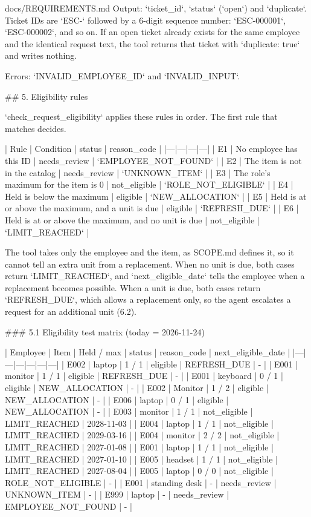 \documentclass[11pt,letterpaper]{article}
\renewcommand{\_}{\textunderscore\allowbreak}
\begin{document}
\begin{appendixpromptbox}{docs/REQUIREMENTS.md}
Output: `ticket_id`, `status` (`open`) and `duplicate`. Ticket IDs are `ESC-` followed by a
6-digit sequence number: `ESC-000001`, `ESC-000002`, and so on. If an open ticket already exists
for the same employee and the identical request text, the tool returns that ticket with
`duplicate: true` and writes nothing.

Errors: `INVALID_EMPLOYEE_ID` and `INVALID_INPUT`.

## 5. Eligibility rules

`check_request_eligibility` applies these rules in order. The first rule that matches decides.

| Rule | Condition | status | reason_code |
|---|---|---|---|
| E1 | No employee has this ID | needs_review | `EMPLOYEE_NOT_FOUND` |
| E2 | The item is not in the catalog | needs_review | `UNKNOWN_ITEM` |
| E3 | The role's maximum for the item is 0 | not_eligible | `ROLE_NOT_ELIGIBLE` |
| E4 | Held is below the maximum | eligible | `NEW_ALLOCATION` |
| E5 | Held is at or above the maximum, and a unit is due | eligible | `REFRESH_DUE` |
| E6 | Held is at or above the maximum, and no unit is due | not_eligible | `LIMIT_REACHED` |

The tool takes only the employee and the item, as SCOPE.md defines it, so it cannot tell an extra
unit from a replacement. When no unit is due, both cases return `LIMIT_REACHED`, and
`next_eligible_date` tells the employee when a replacement becomes possible. When a unit is due,
both cases return `REFRESH_DUE`, which allows a replacement only, so the agent escalates a request
for an additional unit (6.2).

### 5.1 Eligibility test matrix (today = 2026-11-24)

| Employee | Item | Held / max | status | reason_code | next_eligible_date |
|---|---|---|---|---|---|
| E002 | laptop | 1 / 1 | eligible | REFRESH_DUE | - |
| E001 | monitor | 1 / 1 | eligible | REFRESH_DUE | - |
| E001 | keyboard | 0 / 1 | eligible | NEW_ALLOCATION | - |
| E002 | Monitor | 1 / 2 | eligible | NEW_ALLOCATION | - |
| E006 | laptop | 0 / 1 | eligible | NEW_ALLOCATION | - |
| E003 | monitor | 1 / 1 | not_eligible | LIMIT_REACHED | 2028-11-03 |
| E004 | laptop | 1 / 1 | not_eligible | LIMIT_REACHED | 2029-03-16 |
| E004 | monitor | 2 / 2 | not_eligible | LIMIT_REACHED | 2027-01-08 |
| E001 | laptop | 1 / 1 | not_eligible | LIMIT_REACHED | 2027-01-10 |
| E005 | headset | 1 / 1 | not_eligible | LIMIT_REACHED | 2027-08-04 |
| E005 | laptop | 0 / 0 | not_eligible | ROLE_NOT_ELIGIBLE | - |
| E001 | standing desk | - | needs_review | UNKNOWN_ITEM | - |
| E999 | laptop | - | needs_review | EMPLOYEE_NOT_FOUND | - |


\end{appendixpromptbox}
\end{document}
